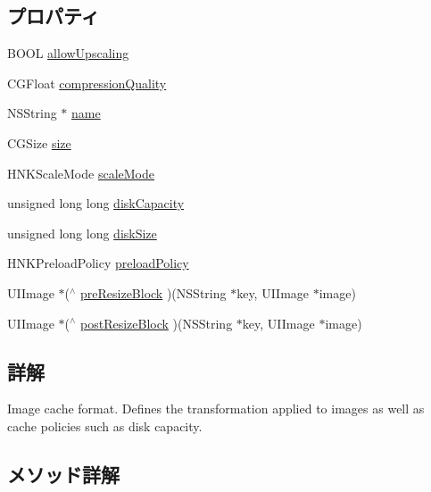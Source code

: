 \subsection*{プロパティ}
\begin{DoxyCompactItemize}
\item 
B\+O\+O\+L \hyperlink{interface_h_n_k_cache_format_aab518aa4d3e96125bb27fd8f9eba8434}{allow\+Upscaling}
\item 
C\+G\+Float \hyperlink{interface_h_n_k_cache_format_a3edfe8ac876f90afe1164ecae20cac21}{compression\+Quality}
\item 
N\+S\+String $\ast$ \hyperlink{interface_h_n_k_cache_format_a2cabd5d85fdedcf7adc29d03e4fd8c41}{name}
\item 
C\+G\+Size \hyperlink{interface_h_n_k_cache_format_a23bcc9d23bed21b1113f28ee296c59f9}{size}
\item 
H\+N\+K\+Scale\+Mode \hyperlink{interface_h_n_k_cache_format_aed4283be1c435789db25798ebe64d90c}{scale\+Mode}
\item 
unsigned long long \hyperlink{interface_h_n_k_cache_format_ab7b9cd33c5cc626688d92511651b8d81}{disk\+Capacity}
\item 
unsigned long long \hyperlink{interface_h_n_k_cache_format_aeeea00feba542e026e941c74ec94e432}{disk\+Size}
\item 
H\+N\+K\+Preload\+Policy \hyperlink{interface_h_n_k_cache_format_a8cf73fa8bf0b16d18bf3040ba05432ce}{preload\+Policy}
\item 
U\+I\+Image $\ast$($^\wedge$ \hyperlink{interface_h_n_k_cache_format_ab7d4412f1d6a87036f8a3b670cd028e9}{pre\+Resize\+Block} )(N\+S\+String $\ast$key, U\+I\+Image $\ast$image)
\item 
U\+I\+Image $\ast$($^\wedge$ \hyperlink{interface_h_n_k_cache_format_aa45b853ab58054e92b3234c6d00e5f91}{post\+Resize\+Block} )(N\+S\+String $\ast$key, U\+I\+Image $\ast$image)
\end{DoxyCompactItemize}


\subsection{詳解}
Image cache format. Defines the transformation applied to images as well as cache policies such as disk capacity. 

\subsection{メソッド詳解}
\hypertarget{interface_h_n_k_cache_format_aaf0bfc464371a36f6c7617a577e31ec9}{}
